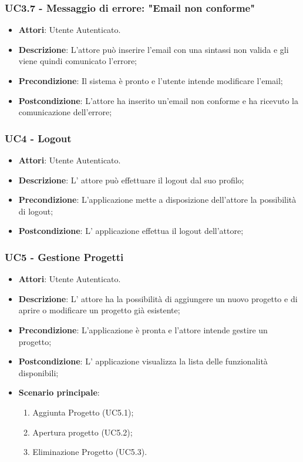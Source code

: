 \subsubsection{UC3.7 - Messaggio di errore: "Email non conforme"} 
\label{sssec:UC3.7} 
\begin{itemize} 
\item \textbf{Attori}: Utente Autenticato.
\item \textbf{Descrizione}: L'attore può inserire l'email con una sintassi non valida e gli viene quindi comunicato l'errore;
\item \textbf{Precondizione}: Il sistema è pronto e l'utente intende modificare l'email;
\item \textbf{Postcondizione}: L'attore ha inserito un'email non conforme e ha ricevuto la comunicazione dell'errore;
\end{itemize} 
\subsubsection{UC4 - Logout} 
\label{sssec:UC4} 
\begin{itemize} 
\item \textbf{Attori}: Utente Autenticato.
\item \textbf{Descrizione}: L' attore può effettuare il logout dal suo profilo;
\item \textbf{Precondizione}: L’applicazione mette a disposizione dell’attore la possibilità di logout;
\item \textbf{Postcondizione}: L' applicazione effettua il logout dell'attore;
\end{itemize} 
\subsubsection{UC5 - Gestione Progetti} 
\label{sssec:UC5} 
\begin{itemize} 
\item \textbf{Attori}: Utente Autenticato.
\item \textbf{Descrizione}: L’ attore ha la possibilità di aggiungere un nuovo progetto e di aprire o modificare un progetto già esistente;
\item \textbf{Precondizione}: L'applicazione è pronta e l'attore intende gestire un progetto;
\item \textbf{Postcondizione}: L’ applicazione visualizza la lista delle funzionalità disponibili;
\item \textbf{Scenario principale}: \begin{enumerate}\item Aggiunta Progetto (UC5.1);\item Apertura progetto (UC5.2);\item Eliminazione Progetto (UC5.3). 
 \end{enumerate}
\end{itemize} 
